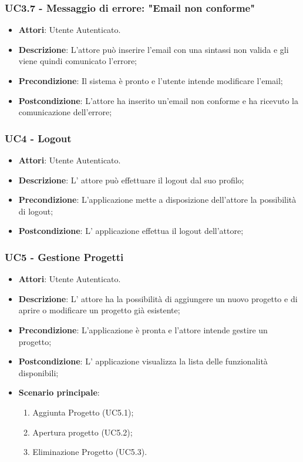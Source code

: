 \subsubsection{UC3.7 - Messaggio di errore: "Email non conforme"} 
\label{sssec:UC3.7} 
\begin{itemize} 
\item \textbf{Attori}: Utente Autenticato.
\item \textbf{Descrizione}: L'attore può inserire l'email con una sintassi non valida e gli viene quindi comunicato l'errore;
\item \textbf{Precondizione}: Il sistema è pronto e l'utente intende modificare l'email;
\item \textbf{Postcondizione}: L'attore ha inserito un'email non conforme e ha ricevuto la comunicazione dell'errore;
\end{itemize} 
\subsubsection{UC4 - Logout} 
\label{sssec:UC4} 
\begin{itemize} 
\item \textbf{Attori}: Utente Autenticato.
\item \textbf{Descrizione}: L' attore può effettuare il logout dal suo profilo;
\item \textbf{Precondizione}: L’applicazione mette a disposizione dell’attore la possibilità di logout;
\item \textbf{Postcondizione}: L' applicazione effettua il logout dell'attore;
\end{itemize} 
\subsubsection{UC5 - Gestione Progetti} 
\label{sssec:UC5} 
\begin{itemize} 
\item \textbf{Attori}: Utente Autenticato.
\item \textbf{Descrizione}: L’ attore ha la possibilità di aggiungere un nuovo progetto e di aprire o modificare un progetto già esistente;
\item \textbf{Precondizione}: L'applicazione è pronta e l'attore intende gestire un progetto;
\item \textbf{Postcondizione}: L’ applicazione visualizza la lista delle funzionalità disponibili;
\item \textbf{Scenario principale}: \begin{enumerate}\item Aggiunta Progetto (UC5.1);\item Apertura progetto (UC5.2);\item Eliminazione Progetto (UC5.3). 
 \end{enumerate}
\end{itemize} 
